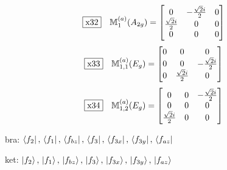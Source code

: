 \documentclass[fleqn,10pt,landscape]{jsarticle}
\begin{document}
\begin{dmath*}
\fbox{x32}\quad \mathbb{M}_{1}^{(a)}(A_{2g})=\begin{bmatrix} 0 & - \frac{\sqrt{2} i}{2} & 0 \\ \frac{\sqrt{2} i}{2} & 0 & 0 \\ 0 & 0 & 0 \end{bmatrix}
\end{dmath*}
\begin{dmath*}
\fbox{x33}\quad \mathbb{M}_{1,1}^{(a)}(E_{g})=\begin{bmatrix} 0 & 0 & 0 \\ 0 & 0 & - \frac{\sqrt{2} i}{2} \\ 0 & \frac{\sqrt{2} i}{2} & 0 \end{bmatrix}
\end{dmath*}
\begin{dmath*}
\fbox{x34}\quad \mathbb{M}_{1,2}^{(a)}(E_{g})=\begin{bmatrix} 0 & 0 & - \frac{\sqrt{2} i}{2} \\ 0 & 0 & 0 \\ \frac{\sqrt{2} i}{2} & 0 & 0 \end{bmatrix}
\end{dmath*}
\vspace{5mm}

\noindent\textbullet\, bra: $\bra{f_{2}},\, \bra{f_{1}},\, \bra{f_{bz}},\, \bra{f_{3}},\, \bra{f_{3x}},\, \bra{f_{3y}},\, \bra{f_{az}}$

\noindent\textbullet\, ket: $\ket{f_{2}},\, \ket{f_{1}},\, \ket{f_{bz}},\, \ket{f_{3}},\, \ket{f_{3x}},\, \ket{f_{3y}},\, \ket{f_{az}}$
\end{document}
